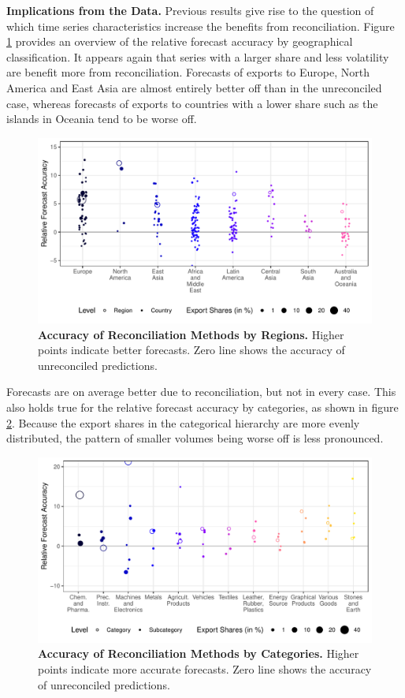 \documentclass[a4paper,fleqn,11pt]{article}
\begin{document}
\noindent\textbf{Implications from the Data.} Previous results give rise to the question of which time series characteristics increase the benefits from reconciliation. Figure \ref{fig:eval_regions} provides an overview of the relative forecast accuracy by geographical classification. It appears again that series with a larger share and less volatility are benefit more from reconciliation. Forecasts of exports to Europe, North America and East Asia are almost entirely better off than in the unreconciled case, whereas forecasts of exports to countries with a lower share such as the islands in Oceania tend to be worse off. 
 \begin{figure}[H]
	\includegraphics[width=\textwidth]{fig/fig_eval_regions}
	\caption[Accuracy of Reconciliation Methods by Regions]{\textbf{Accuracy of Reconciliation Methods by Regions.} Higher points indicate better forecasts. Zero line shows the accuracy of unreconciled predictions.}\label{fig:eval_regions}
\end{figure}
Forecasts are on average better due to reconciliation, but not in every case. This also holds true for the relative forecast accuracy by categories, as shown in figure \ref{fig:eval_categories}. Because the export shares in the categorical hierarchy are more evenly distributed, the pattern of smaller volumes being worse off is less pronounced.
 \begin{figure}[H]
	\includegraphics[width=\textwidth]{fig/fig_eval_categories}
	\caption[Accuracy of Reconciliation Methods by Categories]{\textbf{Accuracy of Reconciliation Methods by Categories.} Higher points indicate more accurate forecasts. Zero line shows the accuracy of unreconciled predictions.}\label{fig:eval_categories}
\end{figure}
\end{document}
